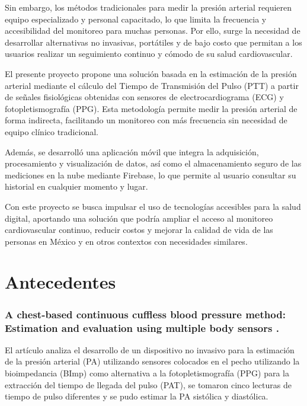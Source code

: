     Sin embargo, los métodos tradicionales para medir la presión arterial requieren equipo especializado y personal capacitado, lo que limita la frecuencia y accesibilidad del monitoreo para muchas personas. Por ello, surge la necesidad de desarrollar alternativas no invasivas, portátiles y de bajo costo que permitan a los usuarios realizar un seguimiento continuo y cómodo de su salud cardiovascular.

    El presente proyecto propone una solución basada en la estimación de la presión arterial mediante el cálculo del Tiempo de Transmisión del Pulso (PTT) a partir de señales fisiológicas obtenidas con sensores de electrocardiograma (ECG) y fotopletismografía (PPG). Esta metodología permite medir la presión arterial de forma indirecta, facilitando un monitoreo con más frecuencia sin necesidad de equipo clínico tradicional.

    Además, se desarrolló una aplicación móvil que integra la adquisición, procesamiento y visualización de datos, así como el almacenamiento seguro de las mediciones en la nube mediante Firebase, lo que permite al usuario consultar su historial en cualquier momento y lugar.

    Con este proyecto se busca impulsar el uso de tecnologías accesibles para la salud digital, aportando una solución que podría ampliar el acceso al monitoreo cardiovascular continuo, reducir costos y mejorar la calidad de vida de las personas en México y en otros contextos con necesidades similares.

\newpage
\section{Antecedentes}

    \subsubsection*{A chest-based continuous cuffless blood pressure method: Estimation and evaluation using multiple body sensors \cite{bodySensor}.}

    El artículo analiza el desarrollo de un dispositivo no invasivo para la estimación de la presión arterial (PA) utilizando sensores colocados en el pecho utilizando la bioimpedancia (BImp) como alternativa a la fotopletismografía (PPG) para la extracción del tiempo de llegada del pulso (PAT), se tomaron cinco lecturas de tiempo de pulso diferentes y se pudo estimar la PA sistólica y diastólica. 
    
